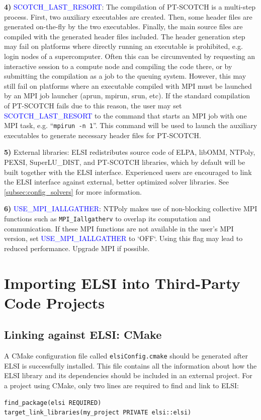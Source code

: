 \documentclass{report}
\begin{document}
\textbf{4)} \textcolor{blue}{SCOTCH\_LAST\_RESORT}: The compilation of PT-SCOTCH is a multi-step process. First, two auxiliary executables are created. Then, some header files are generated on-the-fly by the two executables. Finally, the main source files are compiled with the generated header files included. The header generation step may fail on platforms where directly running an executable is prohibited, e.g. login nodes of a supercomputer. Often this can be circumvented by requesting an interactive session to a compute node and compiling the code there, or by submitting the compilation as a job to the queuing system. However, this may still fail on platforms where an executable compiled with MPI must be launched by an MPI job launcher (aprun, mpirun, srun, etc). If the standard compilation of PT-SCOTCH fails due to this reason, the user may set \textcolor{blue}{SCOTCH\_LAST\_RESORT} to the command that starts an MPI job with one MPI task, e.g. ``\verb+mpirun -n 1+''. This command will be used to launch the auxiliary executables to generate necessary header files for PT-SCOTCH.

\textbf{5)} External libraries: ELSI redistributes source code of ELPA, libOMM, NTPoly, PEXSI, SuperLU\_DIST, and PT-SCOTCH libraries, which by default will be built together with the ELSI interface. Experienced users are encouraged to link the ELSI interface against external, better optimized solver libraries. See \ref{subsec:config_solvers} for more information.

\textbf{6)} \textcolor{blue}{USE\_MPI\_IALLGATHER}: NTPoly makes use of non-blocking collective MPI functions such as \texttt{MPI\_Iallgatherv} to overlap its computation and communication. If these MPI functions are not available in the user's MPI version, set \textcolor{blue}{USE\_MPI\_IALLGATHER} to `OFF`. Using this flag may lead to reduced performance. Upgrade MPI if possible.

\section{Importing ELSI into Third-Party Code Projects}
\label{sec:import}
\subsection{Linking against ELSI: CMake}
\label{subsec:import_cmake}
A CMake configuration file called \texttt{elsiConfig.cmake} should be generated after ELSI is successfully installed. This file contains all the information about how the ELSI library and its dependencies should be included in an external project. For a project using CMake, only two lines are required to find and link to ELSI:
\begin{tcolorbox}
\begin{verbatim}
find_package(elsi REQUIRED)
target_link_libraries(my_project PRIVATE elsi::elsi)
\end{verbatim}
\end{tcolorbox}
\end{document}
